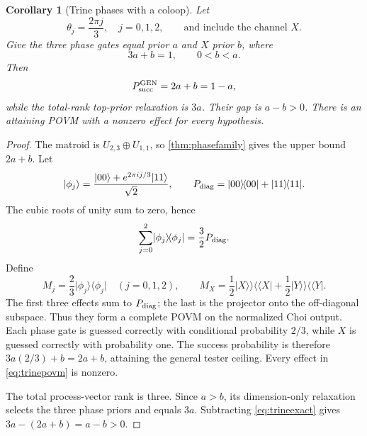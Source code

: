 \documentclass[11pt]{article}
\newtheorem{corollary}[theorem]{Corollary}
\theoremstyle{definition}
\theoremstyle{remark}
\newcommand{\ket}[1]{\lvert #1\rangle}
\newcommand{\bra}[1]{\langle #1\rvert}
\newcommand{\vket}[1]{\lvert #1\rangle\!\rangle}
\newcommand{\vbra}[1]{\langle\!\langle #1\rvert}
\begin{document}
\begin{corollary}[Trine phases with a coloop]\label{cor:trine}
Let
\begin{equation}
 \theta_j=\frac{2\pi j}{3},\quad j=0,1,2,
 \qquad\text{and include the channel }X.                \label{eq:trinegates}
\end{equation}
Give the three phase gates equal prior $a$ and $X$ prior $b$, where
\begin{equation}
                         3a+b=1,\qquad 0<b<a.           \label{eq:trinepriors}
\end{equation}
Then
\begin{equation}
 P_{\rm succ}^{\rm GEN}=2a+b=1-a,                       \label{eq:trineexact}
\end{equation}
while the total-rank top-prior relaxation is $3a$.  Their gap is $a-b>0$.
There is an attaining POVM with a nonzero effect for every hypothesis.
\end{corollary}

\begin{proof}
The matroid is $U_{2,3}\oplus U_{1,1}$, so
\cref{thm:phasefamily} gives the upper bound $2a+b$.  Let
\begin{equation}
 \ket{\phi_j}=\frac{\ket{00}+e^{2\pi i j/3}\ket{11}}{\sqrt2},
 \qquad P_{\rm diag}=\ket{00}\!\bra{00}+\ket{11}\!\bra{11}.  \label{eq:trinestates}
\end{equation}
The cubic roots of unity sum to zero, hence
\begin{equation}
                    \sum_{j=0}^2\ket{\phi_j}\!\bra{\phi_j}
                    =\frac32P_{\rm diag}.               \label{eq:trineframe}
\end{equation}
Define
\begin{equation}
 M_j=\frac23\ket{\phi_j}\!\bra{\phi_j}\quad(j=0,1,2),
 \qquad
 M_X=\frac12\vket X\!\vbra X+\frac12\vket Y\!\vbra Y. \label{eq:trinepovm}
\end{equation}
The first three effects sum to $P_{\rm diag}$; the last is the projector onto
the off-diagonal subspace.  Thus they form a complete POVM on the normalized
Choi output.  Each phase gate is guessed correctly with conditional
probability $2/3$, while $X$ is guessed correctly with probability one.  The
success probability is therefore $3a(2/3)+b=2a+b$, attaining the general
tester ceiling.  Every effect in \cref{eq:trinepovm} is nonzero.

The total process-vector rank is three.  Since $a>b$, its dimension-only
relaxation selects the three phase priors and equals $3a$.  Subtracting
\cref{eq:trineexact} gives $3a-(2a+b)=a-b>0$.
\end{proof}
\end{document}
